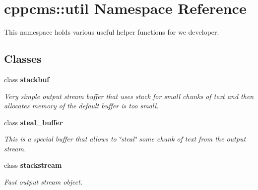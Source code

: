\section{cppcms\-:\-:util \-Namespace \-Reference}
\label{namespacecppcms_1_1util}


\-This namespace holds various useful helper functions for we developer.  


\subsection*{\-Classes}
\begin{DoxyCompactItemize}
\item 
class {\bf stackbuf}
\begin{DoxyCompactList}\small\item\em \-Very simple output stream buffer that uses stack for small chunks of text and then allocates memory of the default buffer is too small. \end{DoxyCompactList}\item 
class {\bf steal\-\_\-buffer}
\begin{DoxyCompactList}\small\item\em \-This is a special buffer that allows to \char`\"{}steal\char`\"{} some chunk of text from the output stream. \end{DoxyCompactList}\item 
class {\bf stackstream}
\begin{DoxyCompactList}\small\item\em \-Fast output stream object. \end{DoxyCompactList}\end{DoxyCompactItemize}
